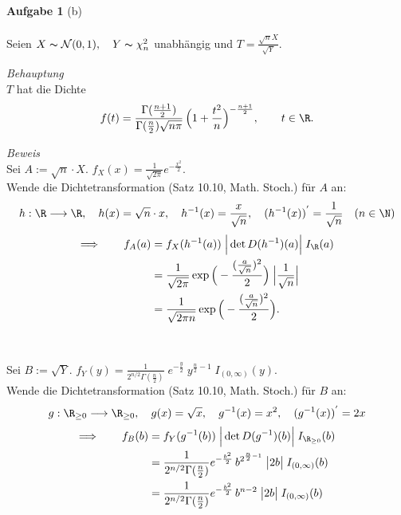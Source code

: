 \documentclass[12pt]{article}
\begin{document}
	\begin{description}
			\item{\textbf{Aufgabe 1} (b)\\\\ Seien $X \thicksim \mathcal{N}(0,1), \quad Y \thicksim \chi_n^2$ \;unabhängig und $T = \frac{\sqrt{n}X}{\sqrt{Y}}.$
			}
			\item{\textit{Behauptung}\\ $T$ hat die Dichte $$f(t) = \frac{\Gamma(\frac{n+1}{2})}{\Gamma(\frac{n}{2})\sqrt{n\pi}} \,\Big(1 + \frac{t^2}{n}\Big)^{-\frac{n+1}{2}},\qquad t \in \R.$$
			}
			\item{\textit{Beweis}\\ Sei $A := \sqrt{n}\cdot X$. \quad $f_X (x) = \frac{1}{\sqrt{2\pi}} e^{-\frac{x^2}{2}}$.\\Wende die Dichtetransformation (Satz 10.10, Math. Stoch.) für $A$ an: $$h: \R \longrightarrow \R,\quad h(x) = \sqrt{n}\cdot x,\quad h^{-1} (x) = \frac{x}{\sqrt{n}}, \quad (h^{-1}(x))^{'} = \frac{1}{\sqrt{n}} \quad (n\in \N)$$ 
			\begin{equation*}\begin{split}\Longrightarrow\qquad f_A(a) &= f_X(h^{-1}(a)) \;\Big|\det D(h^{-1}) (a)  \Big| \;I_\R(a) 
			\\&= \frac{1}{\sqrt{2\pi}} \exp\Big(-\frac{(\frac{a}{\sqrt{n}})^2}{2}\Big)\; \Big|\frac{1}{\sqrt{n}}  \Big| 
			\\&= \frac{1}{\sqrt{2\pi n}} \exp\Big(-\frac{(\frac{a}{\sqrt{n}})^2}{2}\Big).
			\end{split}\end{equation*}\\\\
			Sei $B := \sqrt{Y}$. \quad $f_Y(y) = \frac{1}{2^{n/2} \Gamma(\frac{n}{2})} \;e^{-\frac{y}{2}} \;y^{\frac{n}{2}-1} \; I_{(0,\infty)} (y)$.
			\\Wende die Dichtetransformation (Satz 10.10, Math. Stoch.) für $B$ an: $$g: \R_{\geq 0} \longrightarrow \R_{\geq 0},\quad g(x) = \sqrt{x},\quad g^{-1} (x) = x^2, \quad (g^{-1}(x))^{'} = 2x$$ 
			\begin{equation*}\begin{split}\Longrightarrow\qquad f_B(b) &= f_Y(g^{-1}(b)) \;\Big|\det D(g^{-1}) (b)  \Big| \;I_{\R_{\geq 0}}(b) 
			\\&= \frac{1}{2^{n/2} \Gamma(\frac{n}{2})} e^{-\frac{b^2}{2}} \,b^{2^{\frac{n}{2}-1}} \; \big|2b\big| \;I_{(0,\infty)}(b)
			\\&= \frac{1}{2^{n/2} \Gamma(\frac{n}{2})} e^{-\frac{b^2}{2}} \,b^{n-2} \; \big|2b\big| \;I_{(0,\infty)}(b)

\end{split}
\end{equation*}}
\end{description}
\end{document}
